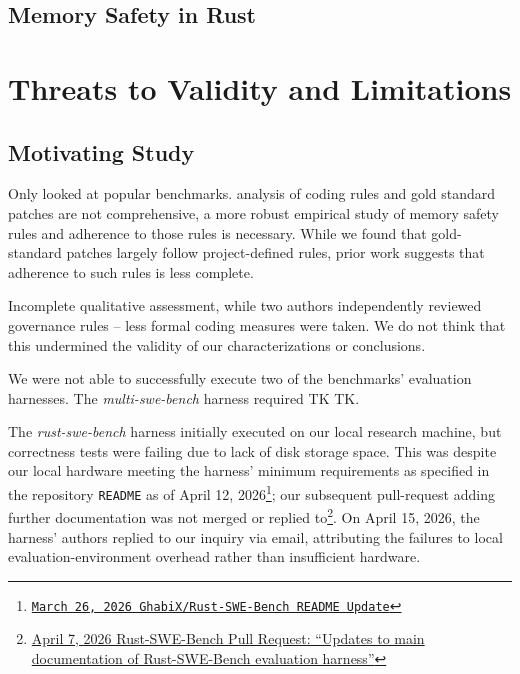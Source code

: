 \documentclass[10pt,conference, anon]{IEEEtran}
\begin{document}
\subsection{Memory Safety in Rust}

\section{Threats to Validity and Limitations}
\label{limitations}
\subsection{Motivating Study}
Only looked at popular benchmarks. analysis of coding rules and gold standard patches are not comprehensive, a more robust empirical study of memory safety rules and adherence to those rules is necessary. While we found that gold-standard patches largely follow project-defined rules, prior work suggests that adherence to such rules is less complete.

Incomplete qualitative assessment, while two authors independently reviewed governance rules -- less formal coding measures were taken. We do not think that this undermined the validity of our characterizations or conclusions.

We were not able to successfully execute two of the benchmarks' evaluation harnesses. The \textit{multi-swe-bench} harness required TK TK.

The \textit{rust-swe-bench} harness initially executed on our local research machine, but correctness tests were failing due to lack of disk storage space. This was despite our local hardware meeting the harness' minimum requirements as specified in the repository \texttt{README} as of April 12, 2026\footnote{\href{github.com/GhabiX/Rust-SWE-Bench/blob/f8222c207c4e50cc75c4f04a0fa5f08dcde57084/README.md}{\texttt{March 26, 2026 GhabiX/Rust-SWE-Bench README Update}}}; our subsequent pull-request adding further documentation was not merged or replied to\footnote{\href{https://github.com/GhabiX/Rust-SWE-Bench/pull/2}{April 7, 2026 Rust-SWE-Bench Pull Request: ``Updates to main documentation of Rust-SWE-Bench evaluation harness''}}. On April 15, 2026, the harness' authors replied to our inquiry via email, attributing the failures to local evaluation-environment overhead rather than insufficient hardware.
\end{document}

